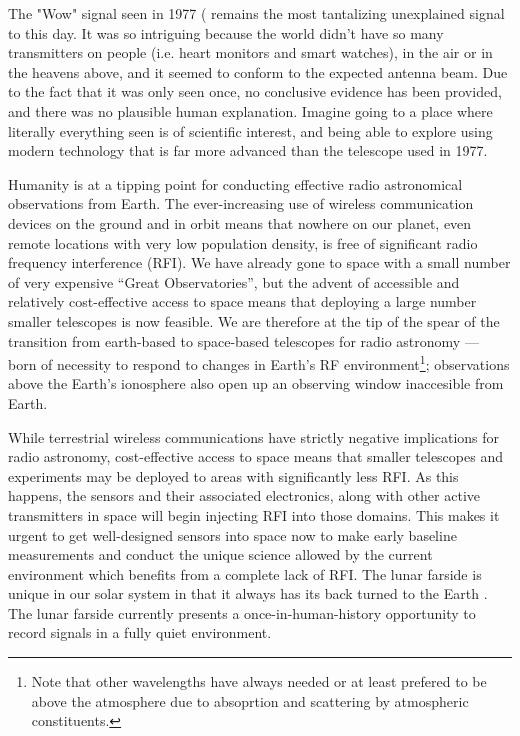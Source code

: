 The "Wow" signal seen in 1977 (\citep{wow} remains the most tantalizing unexplained signal to this day.  %
It was so intriguing because the world didn't have so many transmitters on people (i.e. heart monitors and smart watches), in the air or in the heavens above, and it seemed to conform to the expected antenna beam. Due to the fact that it was only seen once, no conclusive evidence has been provided, and there was no plausible human explanation. Imagine going to a place where literally everything seen is of scientific interest, and being able to explore using modern technology that is far more advanced than the telescope used in 1977.   

Humanity is at a tipping point for conducting effective radio astronomical observations from Earth. The ever-increasing use of wireless communication devices on the ground and in orbit means that nowhere on our planet, even remote locations with very low population density, is free of significant radio frequency interference (RFI). We have already gone to space with a small number of very expensive ``Great Observatories'', but the advent of accessible and relatively cost-effective access to space means that deploying a large number smaller telescopes is now feasible. We are therefore at the tip of the spear of the transition from earth-based to space-based telescopes for radio astronomy --- born of necessity to respond to changes in Earth’s RF environment\footnote{Note that other wavelengths have always needed or at least prefered to be above the atmosphere due to absoprtion and scattering by atmospheric constituents.}; observations above the Earth's ionosphere also open up an observing window inaccesible from Earth.

While terrestrial wireless communications have strictly negative implications for radio astronomy, cost-effective access to space means that smaller telescopes and experiments may be deployed to areas with significantly less RFI. As this happens, the sensors and their associated electronics, along with other active transmitters in space will begin injecting RFI into those domains. This makes it urgent to get well-designed sensors into space now to make early baseline measurements and conduct the unique science allowed by the current environment which benefits from a complete lack of RFI. The lunar farside is unique in our solar system in that it always has its back turned to the Earth \citep{heidmann2002,MACCONE2019233,michaud2020lunar}. The lunar farside currently presents a once-in-human-history opportunity to record signals in a fully quiet environment. 

